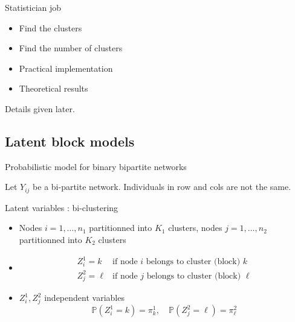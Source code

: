\documentclass[compress,10pt]{beamer}
\begin{document}
\begin{frame}
\begin{block}{Statistician job}
\begin{itemize}
\item Find the clusters
\item Find the number of clusters
\item Practical implementation
\item Theoretical results
\end{itemize}
\end{block}


Details  given later. 

\end{frame}





\subsection[LBM]{Latent block models}

\begin{frame}{Probabilistic model for binary  bipartite networks}

Let $Y_{ij}$ be a bi-partite network. Individuals in row and cols are not the same. 

\begin{block}{Latent variables : bi-clustering}
\begin{itemize}
\item Nodes $i= 1,\dots,n_1$   partitionned into $K_1$ clusters,  nodes $j= 1,\dots,n_2$  partitionned into $K_2$ clusters
\item $$\begin{array}{cl}
Z^1_i = k & \mbox{if node $i$ belongs to cluster (block) $k$}\\
Z^2_j = \ell & \mbox{if node $j$ belongs to cluster (block) $\ell$}
\end{array}$$
\item $Z^1_i, Z^2_j$ independent variables
$$ \mathbb{P}(Z^1_i = k) = \pi^1_k,\quad  \mathbb{P}(Z^2_j = \ell) = \pi^2_\ell$$
\end{itemize}
\end{block}

\end{frame}

\end{document}

